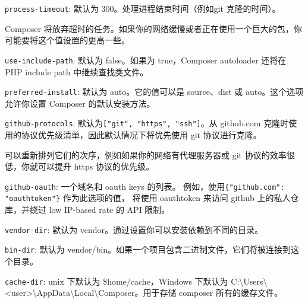 \begin{compactitem}
\item \texttt{process-timeout}: 默认为 300。处理进程结束时间（例如git 克隆的时间）。

Composer 将放弃超时的任务。如果你的网络缓慢或者正在使用一个巨大的包，你可能要将这个值设置的更高一些。
\item \texttt{use-include-path}: 默认为 false。如果为 true，Composer autoloader 还将在 PHP include path 中继续查找类文件。
\item \texttt{preferred-install}: 默认为 auto。它的值可以是 source、dist 或 auto。这个选项允许你设置 Composer 的默认安装方法。
\item \texttt{github-protocols}: 默认为\texttt{["git", "https", "ssh"]}。从 github.com 克隆时使用的协议优先级清单，因此默认情况下将优先使用 git 协议进行克隆。

可以重新排列它们的次序，例如如果你的网络有代理服务器或 git 协议的效率很低，你就可以提升 https 协议的优先级。
\item \texttt{github-oauth}: 一个域名和 oauth keys 的列表。 例如，使用\texttt{\{"github.com": "oauthtoken"\}} 作为此选项的值， 将使用 oauthtoken 来访问 github 上的私人仓库，并绕过 low IP-based rate 的 API 限制。

\item \texttt{vendor-dir}: 默认为 vendor。通过设置你可以安装依赖到不同的目录。
\item \texttt{bin-dir}: 默认为 vendor/bin。如果一个项目包含二进制文件，它们将被连接到这个目录。
\item \texttt{cache-dir}: unix 下默认为 \$home/cache，Windows 下默认为 C:\textbackslash Users\textbackslash <user>\textbackslash AppData\textbackslash Local\textbackslash Composer。用于存储 composer 所有的缓存文件。


\end{compactitem}
